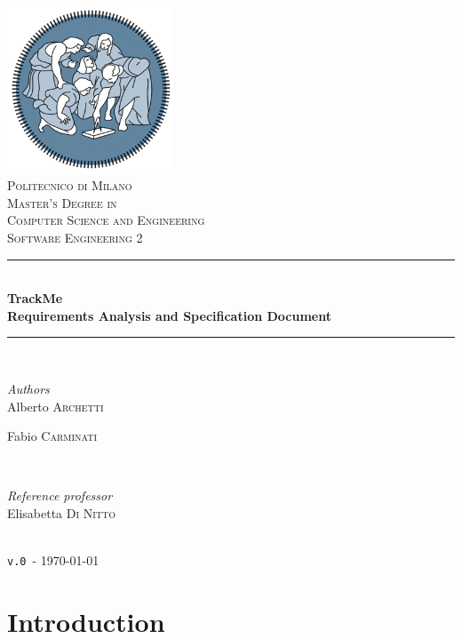 \documentclass[12pt]{article}
\def \thisDocVersion {\texttt{v.0}}
\begin{document}
\begin{titlepage}
  \newcommand{\HRule}{\rule{\linewidth}{0.5mm}}
  \center
  \includegraphics[width=140pt]{polimi.png}\\[1cm]
  \textsc{\LARGE Politecnico di Milano}\\[1cm]
  \textsc{\Large Master's Degree in \\Computer Science and Engineering}\\[0.5cm]
  \textsc{\large Software Engineering 2}\\[0.5cm]
  \HRule \\[0.4cm]
  { \huge \bfseries TrackMe\\[0.4cm] Requirements Analysis and Specification Document }\\[0.4cm]

  \HRule \\[1cm]
  \begin{minipage}{0.4\textwidth}
  \begin{flushleft} \large
  \emph{Authors}\\
  Alberto \textsc{Archetti}

  Fabio \textsc{Carminati}
  \end{flushleft}
  \end{minipage}
  ~
  \begin{minipage}{0.4\textwidth}
  \begin{flushright} \large
  \emph{Reference professor} \\
  Elisabetta \textsc{Di Nitto}
  \end{flushright}
  \end{minipage}\\[1cm]
  {\large \thisDocVersion\ - \today}\\[1cm]
  \vfill
\end{titlepage}

\clearpage
{}
\nonumber
\tableofcontents
\clearpage
{}

\clearpage
\section{Introduction}
\label{sec:intro}
\end{document}
